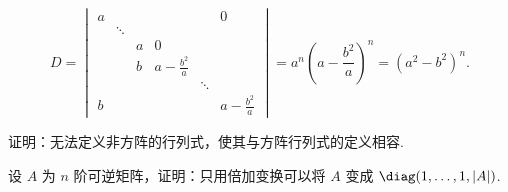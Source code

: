 \begin{exercise}
\begin{exgroup}
\begin{answer}
\begin{enumerate}
                    \[
                        D = \begin{vmatrix}
                            a &         &   &                   &         & 0                 \\
                              & \ddots  &   &                   &         &                   \\
                              &         & a & 0                 &         &                   \\
                              &         & b & a - \frac{b^2}{a} &         &                   \\
                              &         &   &                   & \ddots  &                   \\
                            b &         &   &                   &         & a - \frac{b^2}{a}
                        \end{vmatrix}
                        = a^n (a - \frac{b^2}{a})^n
                        = (a^2 - b^2)^n.
                    \]
            \end{enumerate}
        \end{answer}
    \end{exgroup}

    \begin{exgroup}
        \item 证明：无法定义非方阵的行列式，使其与方阵行列式的定义相容.
        \begin{answer}

        \end{answer}

        \item 设 $A$ 为 $n$ 阶可逆矩阵，证明：只用倍加变换可以将 $A$ 变成 $\diag(1,\ldots,1,|A|)$.
        \begin{answer}

        \end{answer}


\end{exgroup}
\end{exercise}
